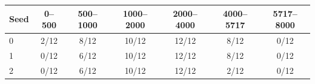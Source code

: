 \begin{tabular}{@{}lcccccc@{}}
\toprule
Seed & 0--500 & 500--1000 & 1000--2000 & 2000--4000 & 4000--5717 & 5717--8000 \\
\midrule
0 & 2/12 & 8/12 & 10/12 & 12/12 & 8/12 & 0/12 \\
1 & 0/12 & 6/12 & 10/12 & 12/12 & 8/12 & 0/12 \\
2 & 0/12 & 6/12 & 10/12 & 12/12 & 2/12 & 0/12 \\
\bottomrule
\end{tabular}
